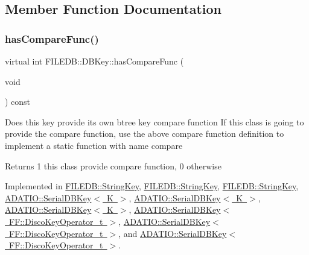 \subsection{Member Function Documentation}
\mbox{\label{classFILEDB_1_1DBKey_a416c32ba10caf76e6b7ff4986cfc3c05}} 
\subsubsection{\texorpdfstring{hasCompareFunc()}{hasCompareFunc()}\hspace{0.1cm}{\footnotesize\ttfamily [1/3]}}
{\footnotesize\ttfamily virtual int F\+I\+L\+E\+D\+B\+::\+D\+B\+Key\+::has\+Compare\+Func (\begin{DoxyParamCaption}\item[{void}]{ }\end{DoxyParamCaption}) const\hspace{0.3cm}{\ttfamily [pure virtual]}}

Does this key provide its own btree key compare function If this class is going to provide the compare function, use the above compare function definition to implement a static function with name compare

\begin{DoxyReturn}{Returns}
1 this class provide compare function, 0 otherwise 
\end{DoxyReturn}


Implemented in \mbox{\hyperlink{classFILEDB_1_1StringKey_a430c4d6d22db7160c501c1703f9f13cf}{F\+I\+L\+E\+D\+B\+::\+String\+Key}}, \mbox{\hyperlink{classFILEDB_1_1StringKey_a430c4d6d22db7160c501c1703f9f13cf}{F\+I\+L\+E\+D\+B\+::\+String\+Key}}, \mbox{\hyperlink{classFILEDB_1_1StringKey_a430c4d6d22db7160c501c1703f9f13cf}{F\+I\+L\+E\+D\+B\+::\+String\+Key}}, \mbox{\hyperlink{classADATIO_1_1SerialDBKey_a2f28d2ac39919d9cb9f6fc097944c49c}{A\+D\+A\+T\+I\+O\+::\+Serial\+D\+B\+Key$<$ K $>$}}, \mbox{\hyperlink{classADATIO_1_1SerialDBKey_a2f28d2ac39919d9cb9f6fc097944c49c}{A\+D\+A\+T\+I\+O\+::\+Serial\+D\+B\+Key$<$ K $>$}}, \mbox{\hyperlink{classADATIO_1_1SerialDBKey_a2f28d2ac39919d9cb9f6fc097944c49c}{A\+D\+A\+T\+I\+O\+::\+Serial\+D\+B\+Key$<$ K $>$}}, \mbox{\hyperlink{classADATIO_1_1SerialDBKey_a2f28d2ac39919d9cb9f6fc097944c49c}{A\+D\+A\+T\+I\+O\+::\+Serial\+D\+B\+Key$<$ F\+F\+::\+Disco\+Key\+Operator\+\_\+t $>$}}, \mbox{\hyperlink{classADATIO_1_1SerialDBKey_a2f28d2ac39919d9cb9f6fc097944c49c}{A\+D\+A\+T\+I\+O\+::\+Serial\+D\+B\+Key$<$ F\+F\+::\+Disco\+Key\+Operator\+\_\+t $>$}}, and \mbox{\hyperlink{classADATIO_1_1SerialDBKey_a2f28d2ac39919d9cb9f6fc097944c49c}{A\+D\+A\+T\+I\+O\+::\+Serial\+D\+B\+Key$<$ F\+F\+::\+Disco\+Key\+Operator\+\_\+t $>$}}.

